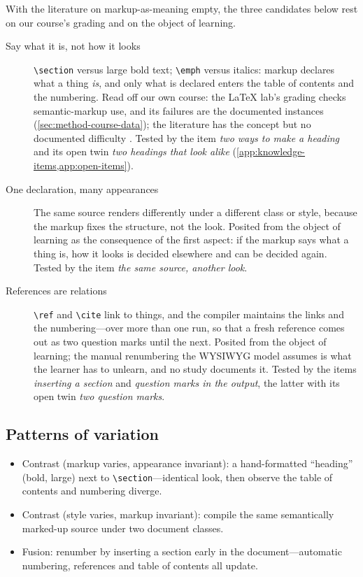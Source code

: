 With the literature on markup-as-meaning empty, the three candidates below
rest on our course's grading and on the object of learning.

\begin{description}
  \item[Say what it is, not how it looks]
    \verb|\section| versus large bold text; \verb|\emph| versus italics:
    markup declares what a thing \emph{is}, and only what is declared
    enters the table of contents and the numbering.
    Read off our own course: the LaTeX lab's grading checks
    semantic-markup use, and its failures are the documented instances
    (\cref{sec:method-course-data}); the literature has the concept but
    no documented difficulty \autocite{Park2011WebDev}.
    Tested by the item \emph{two ways to make a heading} and its open
    twin \emph{two headings that look alike}
    (\cref{app:knowledge-items,app:open-items}).
  \item[One declaration, many appearances]
    The same source renders differently under a different class or
    style, because the markup fixes the structure, not the look.
    Posited from the object of learning as the consequence of the first
    aspect: if the markup says what a thing is, how it looks is decided
    elsewhere and can be decided again.
    Tested by the item \emph{the same source, another look}.
  \item[References are relations]
    \verb|\ref| and \verb|\cite| link to things, and the compiler
    maintains the links and the numbering---over more than one run, so
    that a fresh reference comes out as two question marks until the
    next.
    Posited from the object of learning; the manual renumbering the
    WYSIWYG model assumes is what the learner has to unlearn, and no
    study documents it.
    Tested by the items \emph{inserting a section} and \emph{question
    marks in the output}, the latter with its open twin \emph{two
    question marks}.
\end{description}

\subsection{Patterns of variation}

\begin{itemize}
  \item Contrast (markup varies, appearance invariant): a hand-formatted
    \enquote{heading} (bold, large) next to \verb|\section|---identical
    look, then observe the table of contents and numbering diverge.
  \item Contrast (style varies, markup invariant): compile the same
    semantically marked-up source under two document classes.
  \item Fusion: renumber by inserting a section early in the
    document---automatic numbering, references and table of contents all
    update.
\end{itemize}
